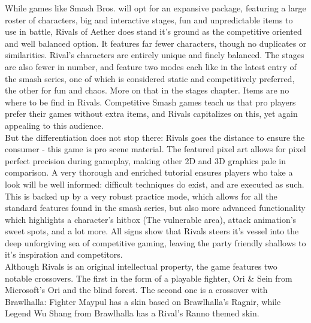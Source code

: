 \documentclass{article}
\begin{document}
While games like Smash Bros. will opt for an expansive package, featuring a large roster of characters, big and interactive stages, fun and unpredictable items to use in battle, Rivals of Aether does stand it's ground as the competitive oriented and well balanced option. It features far fewer characters, though no duplicates or similarities. Rival's characters are entirely unique and finely balanced. The stages are also fewer in number, and feature two modes each like in the latest entry of the smash series, one of which is considered static and competitively preferred, the other for fun and chaos. More on that in the stages chapter. Items are no where to be find in Rivals. Competitive Smash games teach us that pro players prefer their games without extra items, and Rivals capitalizes on this, yet again appealing to this audience.\\
But the differentiation does not stop there: Rivals goes the distance to ensure the consumer - this game is pro scene material. The featured pixel art allows for pixel perfect precision during gameplay, making other 2D and 3D graphics pale in comparison. A very thorough and enriched tutorial ensures players who take a look will be well informed: difficult techniques do exist, and are executed as such. This is backed up by a very robust practice mode, which allows for all the standard features found in the smash series, but also more advanced functionality which highlights a character's hitbox (The vulnerable area), attack animation's sweet spots, and a lot more. All signs show that Rivals steers it's vessel into the deep unforgiving sea of competitive gaming, leaving the party friendly shallows to it's inspiration and competitors.\\

Although Rivals is an original intellectual property, the game features two notable crossovers. The first in the form of a playable fighter, Ori \& Sein from Microsoft's Ori and the blind forest. The second one is a crossover with Brawlhalla: Fighter Maypul has a skin based on Brawlhalla's Ragnir, while Legend Wu Shang from Brawlhalla has a Rival's Ranno themed skin.\cite{crossover:18}\\

\newpage
\end{document}
